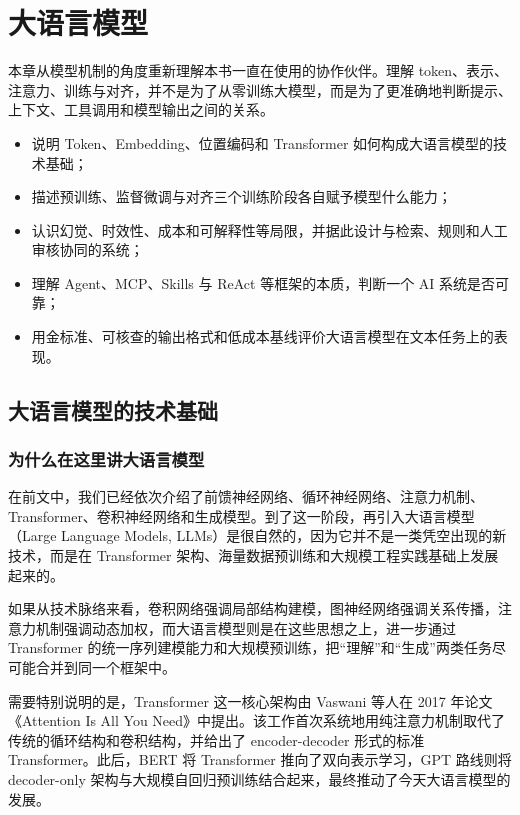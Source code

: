 ﻿\chapter{大语言模型}

本章从模型机制的角度重新理解本书一直在使用的协作伙伴。理解 token、表示、注意力、训练与对齐，并不是为了从零训练大模型，而是为了更准确地判断提示、上下文、工具调用和模型输出之间的关系。

\begin{chapterguide}
\begin{itemize}
  \item 说明 Token、Embedding、位置编码和 Transformer 如何构成大语言模型的技术基础；
  \item 描述预训练、监督微调与对齐三个训练阶段各自赋予模型什么能力；
  \item 认识幻觉、时效性、成本和可解释性等局限，并据此设计与检索、规则和人工审核协同的系统；
  \item 理解 Agent、MCP、Skills 与 ReAct 等框架的本质，判断一个 AI 系统是否可靠；
  \item 用金标准、可核查的输出格式和低成本基线评价大语言模型在文本任务上的表现。
\end{itemize}
\end{chapterguide}

\section{大语言模型的技术基础}
\label{sec:llm_foundation}

\subsection{为什么在这里讲大语言模型}

在前文中，我们已经依次介绍了前馈神经网络、循环神经网络、注意力机制、Transformer、卷积神经网络和生成模型。到了这一阶段，再引入大语言模型（Large Language Models, LLMs）是很自然的，因为它并不是一类凭空出现的新技术，而是在 Transformer 架构、海量数据预训练和大规模工程实践基础上发展起来的。

如果从技术脉络来看，卷积网络强调局部结构建模，图神经网络强调关系传播，注意力机制强调动态加权，而大语言模型则是在这些思想之上，进一步通过 Transformer 的统一序列建模能力和大规模预训练，把“理解”和“生成”两类任务尽可能合并到同一个框架中。

需要特别说明的是，Transformer 这一核心架构由 Vaswani 等人在 2017 年论文《Attention Is All You Need》中提出。该工作首次系统地用纯注意力机制取代了传统的循环结构和卷积结构，并给出了 encoder-decoder 形式的标准 Transformer。此后，BERT 将 Transformer 推向了双向表示学习，GPT 路线则将 decoder-only 架构与大规模自回归预训练结合起来，最终推动了今天大语言模型的发展。

